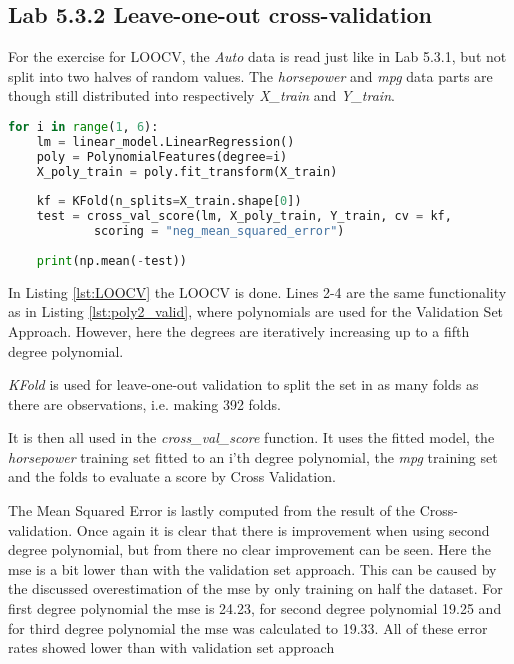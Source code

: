 
\subsection{Lab 5.3.2 Leave-one-out cross-validation}
For the exercise for LOOCV, the \emph{Auto} data is read just like in Lab 5.3.1, but not split into two halves of random values. The \emph{horsepower} and \emph{mpg} data parts are though still distributed into respectively \emph{X\_train} and \emph{Y\_train}. 

\begin{lstlisting}[language=Python, label=lst:LOOCV, caption=Leave-one-out Cross-validation loop]
for i in range(1, 6):
	lm = linear_model.LinearRegression()
	poly = PolynomialFeatures(degree=i)
	X_poly_train = poly.fit_transform(X_train)
	
	kf = KFold(n_splits=X_train.shape[0]) 
	test = cross_val_score(lm, X_poly_train, Y_train, cv = kf, 
			scoring = "neg_mean_squared_error")
	
	print(np.mean(-test))
\end{lstlisting}

In Listing \ref{lst:LOOCV} the LOOCV is done. Lines 2-4 are the same functionality as in Listing \ref{lst:poly2_valid}, where polynomials are used for the Validation Set Approach. However, here the degrees are iteratively increasing up to a fifth degree polynomial.

\emph{KFold} is used for leave-one-out validation to split the set in as many folds as there are observations, i.e. making 392 folds.

It is then all used in the \emph{cross\_val\_score} function. It uses the fitted model, the \emph{horsepower} training set fitted to an i'th degree polynomial, the \emph{mpg} training set and the folds to evaluate a score by Cross Validation.



The Mean Squared Error is lastly computed from the result of the Cross-validation. Once again it is clear that there is improvement when using second degree polynomial, but from there no clear improvement can be seen. Here the mse is a bit lower than with the validation set approach. This can be caused by the discussed overestimation of the mse by only training on half the dataset. For first degree polynomial the mse is 24.23, for second degree polynomial 19.25 and for third degree polynomial the mse was calculated to 19.33. All of these error rates showed lower than with validation set approach


